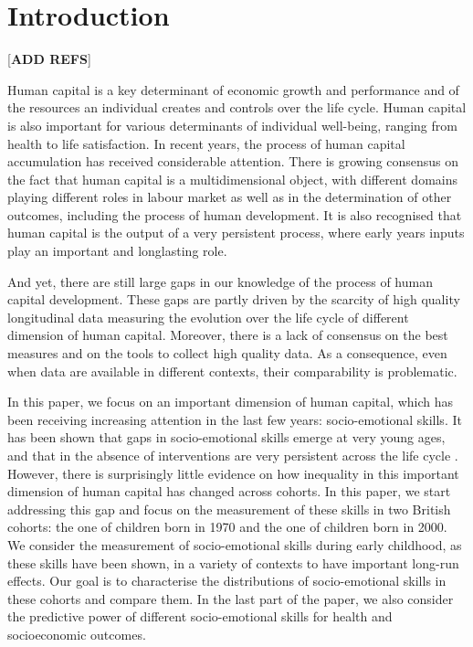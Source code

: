 \section{Introduction}

[\textbf{ADD REFS}]

Human capital is a key determinant of economic growth and performance and of the resources an individual creates and controls over the life cycle. Human capital is also important for various determinants of individual well-being, ranging from health to life satisfaction.  In recent years, the process of human capital accumulation has received considerable attention. There is growing consensus on the fact that human capital is a multidimensional object, with different domains playing different roles in labour market as well as in the determination of other outcomes, including the process of human development. It is also recognised that human capital is the output of a very persistent process, where early years inputs play an important and longlasting role.

And yet, there are still large gaps in our knowledge of the process of human capital development. These gaps are partly driven by the scarcity of high quality longitudinal data measuring the evolution over the life cycle of different dimension of human capital. Moreover, there is a lack of consensus on the best measures and on the tools to collect high quality data. As a consequence, even when data are available in different contexts, their comparability is problematic.

In this paper, we focus on an important dimension of human capital, which has been receiving increasing attention in the last few years: socio-emotional skills. It has been shown that gaps in socio-emotional skills emerge at very young ages, and that in the absence of interventions are very persistent across the life cycle \citep{Cunha2006}. However, there is surprisingly little evidence on how inequality in this important dimension of human capital has changed across cohorts. In this paper, we start addressing this gap and focus on the measurement of these skills in two British cohorts: the one of children born in 1970 and the one of children born in 2000. We consider the measurement of socio-emotional skills during early childhood, as these skills have been shown, in a variety of contexts \citep{Almlund2011} to have important long-run effects. Our goal is to characterise the distributions of socio-emotional skills in these cohorts and compare them. In the last part of the paper, we also consider the predictive power of different socio-emotional skills for health and socioeconomic outcomes.

